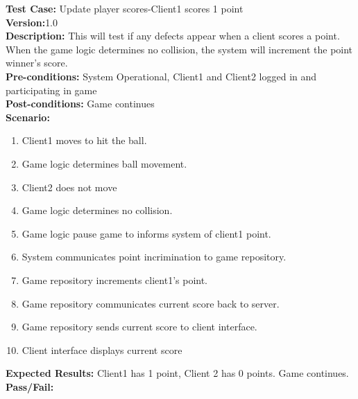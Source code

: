 \noindent \textbf{Test Case:} Update player scores-Client1 scores 1 point\\
\textbf{Version:}1.0\\
\textbf{Description:} This will test if any defects appear when a client scores a point.  When the game logic determines no collision, the system will increment the point winner's score.\\
\textbf{Pre-conditions:} System Operational, Client1 and Client2 logged in and participating in game \\
\textbf{Post-conditions:} Game continues\\
\textbf{Scenario:}
\begin{enumerate}
\item Client1 moves to hit the ball.
\item Game logic determines ball movement.
\item Client2 does not move 
\item Game logic determines no collision. 
\item Game logic pause game to informs system of client1 point.
\item System communicates point incrimination to game repository.
\item Game repository increments client1’s point.
\item Game repository communicates current score back to server.
\item Game repository sends current score to client interface.
\item Client interface displays current score
\end{enumerate}
\textbf{Expected Results:} Client1 has 1 point, Client 2 has 0 points.  Game continues.\\
\textbf{Pass/Fail:}

